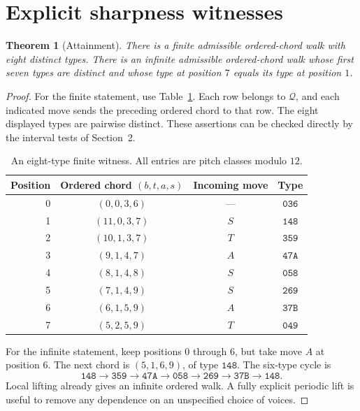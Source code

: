 \documentclass[11pt,letterpaper]{article}
\newtheorem{theorem}{Theorem}
\theoremstyle{definition}\newtheorem{definition}[theorem]{Definition}
\newcommand{\Q}{\mathcal Q}
\newcommand{\typ}[1]{\mathtt{#1}}
\begin{document}
\section{Explicit sharpness witnesses}
\begin{theorem}[Attainment]\label{thm:sharp}
There is a finite admissible ordered-chord walk with eight distinct types. There is an infinite admissible ordered-chord walk whose first seven types are distinct and whose type at position $7$ equals its type at position $1$.
\end{theorem}
\begin{proof}
For the finite statement, use Table~\ref{tab:witness}. Each row belongs to $\Q$, and each indicated move sends the preceding ordered chord to that row. The eight displayed types are pairwise distinct. These assertions can be checked directly by the interval tests of Section~2.
\begin{table}[h!]
\centering
\renewcommand{\arraystretch}{1.14}
\begin{tabular}{rccc}\toprule
Position & Ordered chord $(b,t,a,s)$ & Incoming move & Type\\\midrule
0 & $(0,0,3,6)$ & --- & $\typ{036}$\\
1 & $(11,0,3,7)$ & $S$ & $\typ{148}$\\
2 & $(10,1,3,7)$ & $T$ & $\typ{359}$\\
3 & $(9,1,4,7)$ & $A$ & $\typ{47A}$\\
4 & $(8,1,4,8)$ & $S$ & $\typ{058}$\\
5 & $(7,1,4,9)$ & $S$ & $\typ{269}$\\
6 & $(6,1,5,9)$ & $A$ & $\typ{37B}$\\
7 & $(5,2,5,9)$ & $T$ & $\typ{049}$\\\bottomrule
\end{tabular}
\caption{An eight-type finite witness. All entries are pitch classes modulo $12$.}\label{tab:witness}
\end{table}

For the infinite statement, keep positions $0$ through $6$, but take move $A$ at position $6$. The next chord is $(5,1,6,9)$, of type $\typ{148}$. The six-type cycle is
\begin{equation}\label{eq:sixcycle}
 \typ{148}\to\typ{359}\to\typ{47A}\to\typ{058}
 \to\typ{269}\to\typ{37B}\to\typ{148}.
\end{equation}
Local lifting already gives an infinite ordered walk. A fully explicit periodic lift is useful to remove any dependence on an unspecified choice of voices.


\end{proof}
\end{document}
